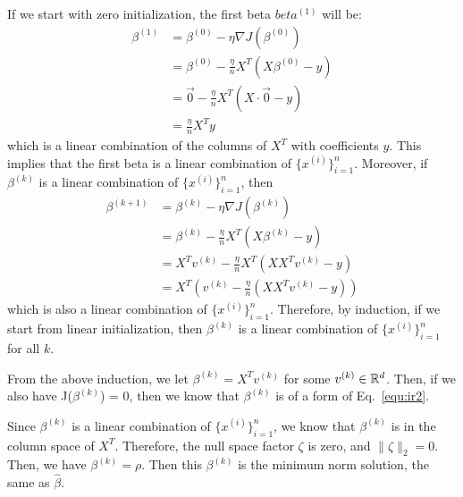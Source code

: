\begin{answer}
    If we start with zero initialization, the first beta $beta^{(1)}$ will be:
    \begin{align*}
        \beta^{(1)} &= \beta^{(0)} - \eta \nabla J(\beta^{(0)}) \\
        &= \beta^{(0)} - \frac{\eta}{n} X^T (X \beta^{(0)} - y) \\
        &= \vec{0} - \frac{\eta}{n} X^T (X \cdot \vec{0} - y) \\
        &= \frac{\eta}{n} X^T y
    \end{align*}
    which is a linear combination of the columns of $X^T$ with coefficients $y$.
    This implies that the first beta is a linear combination of $\{x^{(i)}\}_{i=1}^n$.
    Moreover, if $\beta^{(k)}$ is a linear combination of $\{x^{(i)}\}_{i=1}^n$, then
    \begin{align*}
        \beta^{(k+1)} &= \beta^{(k)} - \eta \nabla J(\beta^{(k)}) \\
        &= \beta^{(k)} - \frac{\eta}{n} X^T (X \beta^{(k)} - y) \\
        &= X^T v^{(k)} - \frac{\eta}{n} X^T (X X^T v^{(k)} - y) \\
        &= X^T (v^{(k)} - \frac{\eta}{n} (X X^T v^{(k)} - y))
    \end{align*}
    which is also a linear combination of $\{x^{(i)}\}_{i=1}^n$. Therefore,
    by induction, if we start from linear initialization, then $\beta^{(k)}$ is a linear combination of $\{x^{(i)}\}_{i=1}^n$ for all $k$.
    
    From the above induction, we let $\beta^{(k)} = X^T v^{(k)}$ for some $v^{(k)} \in \mathbb{R}^d$.
    Then, if we also have J($\beta^{(k)}$) = 0, then we know that $\beta^{(k)}$ is of a form of Eq.~\eqref{equ:ir2}.
    
    Since $\beta^{(k)}$ is a linear combination of $\{x^{(i)}\}_{i=1}^n$, we know that $\beta^{(k)}$ is in the column space of $X^T$.
    Therefore, the null space factor $\zeta$ is zero, and $\|\zeta\|_2 = 0$.
    Then, we have $\beta^{(k)} = \rho$. Then this $\beta^{(k)}$ is the minimum norm solution, the same as $\hat{\beta}$.
\end{answer}